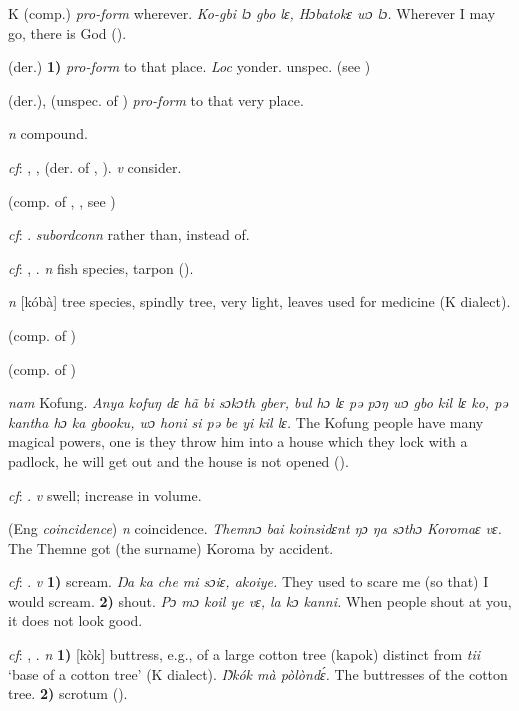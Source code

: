 \begin{letter}{K}
 (comp.) \textit{pro-form} wherever. \textit{Ko-gbi lɔ gbo lɛ, Hɔbatokɛ wɔ lɔ.} Wherever I may go, there is God (\citealt{Pichl1967}).

 (der.) \textbf{1)} \textit{pro-form} to that place. \textit{Loc} yonder. unspec.  (see )

 (der.), (unspec. of ) \textit{pro-form} to that very place.

 \textit{n} compound.

 \textit{cf}: , ,  (der. of , ). \textit{v} consider.

 (comp. of , , see ) 

 \textit{cf}: . \textit{subordconn} rather than, instead of.

 \textit{cf}: , . \textit{n} fish species, tarpon (\citealt{Pichl1967}). 

 \textit{n} [kóbà] tree species, spindly tree, very light, leaves used for medicine (K dialect). 

 (comp. of ) 

 (comp. of ) 

 \textit{nam} Kofung. \textit{Anya kofuŋ dɛ hã bi sɔkɔth gber, bul hɔ lɛ pə pɔŋ wɔ gbo kil lɛ ko, pə kantha hɔ ka gbooku, wɔ honi si pə be yi kil lɛ.} The Kofung people have many magical powers, one is they throw him into a house which they lock with a padlock, he will get out and the house is not opened (\citealt{Pichl1967}).

 \textit{cf}: . \textit{v} swell; increase in volume.

 (Eng \textit{coincidence}) \textit{n} coincidence. \textit{Themnɔ bai koinsidɛnt ŋɔ ŋa sɔthɔ Koromaɛ vɛ.} The Themne got (the surname) Koroma by accident.

 \textit{cf}: . \textit{v} \textbf{1)} scream. \textit{Ŋa ka che mi sɔiɛ, akoiye.} They used to scare me (so that) I would scream. \textbf{2)} shout. \textit{Pɔ mɔ koil ye vɛ, la kɔ kanni.} When people shout at you, it does not look good.

 \textit{cf}: , . \textit{n} \textbf{1)} [kòk] buttress, e.g., of a large cotton tree (kapok) distinct from \textit{tii} ‘base of a cotton tree' (K dialect). \textit{Ŋ̀kók mà pòlòndɛ́.} The buttresses of the cotton tree. \textbf{2)} scrotum (\citealt{Pichl1967}). 


\end{letter}

